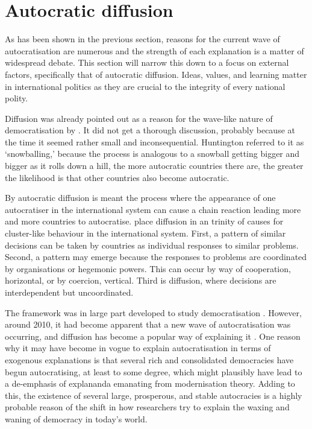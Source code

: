 \section{Autocratic diffusion}
As has been shown in the previous section, reasons for the current wave of autocratisation are numerous and the strength of each explanation is a matter of widespread debate. This section will narrow this down to a focus on external factors, specifically that of autocratic diffusion. Ideas, values, and learning matter in international politics as they are crucial to the integrity of every national polity.

Diffusion was already pointed out as a reason for the wave-like nature of democratisation by \citet{huntington_third_1991}. It did not get a thorough discussion, probably because at the time it seemed rather small and inconsequential. Huntington referred to it as `snowballing,' because the process is analogous to a snowball getting bigger and bigger as it rolls down a hill, the more autocratic countries there are, the greater the likelihood is that other countries also become autocratic.

By autocratic diffusion is meant the process where the appearance of one autocratiser in the international system can cause a chain reaction leading more and more countries to autocratise. \citet{elkins_waves_2005} place diffusion in an trinity of causes for cluster-like behaviour in the international system. First, a pattern of similar decisions can be taken by countries as individual responses to similar problems. Second, a pattern may emerge because the responses to problems are coordinated by organisations or hegemonic powers. This can occur by way of cooperation, horizontal, or by coercion, vertical. Third is diffusion, where decisions are interdependent but uncoordinated. 

The framework was in large part developed to study democratisation \citep{elkins_waves_2005, huntington_third_1991}. However, around 2010, it had become apparent that a new wave of autocratisation was occurring, and diffusion has become a popular way of explaining it \citep{ambrosio_constructing_2010, gelman_authoritarian_2008, lankina_authoritarian_2016, weyland_autocratic_2017}. One reason why it may have become in vogue to explain autocratisation in terms of exogenous explanations is that several rich and consolidated democracies have begun autocratising, at least to some degree, which might plausibly have lead to a de-emphasis of explananda emanating from modernisation theory. Adding to this, the existence of several large, prosperous, and stable autocracies is a highly probable reason of the shift in how researchers try to explain the waxing and waning of democracy in today's world. 

